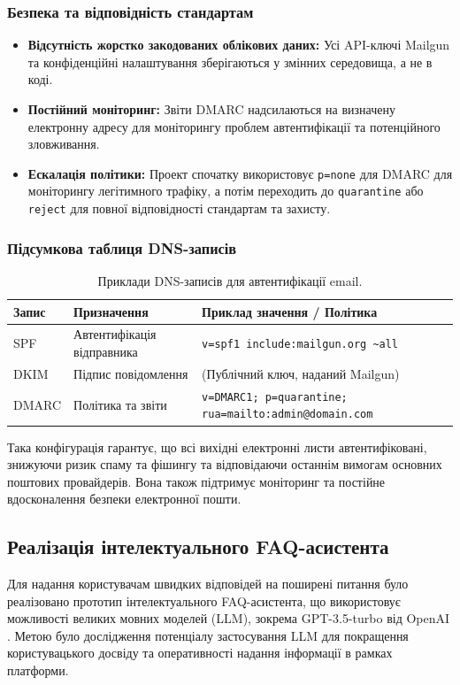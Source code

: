 \subsubsection{Безпека та відповідність стандартам}

\begin{itemize}
    \item \textbf{Відсутність жорстко закодованих облікових даних:} Усі API-ключі Mailgun та конфіденційні налаштування зберігаються у змінних середовища, а не в коді.
    \item \textbf{Постійний моніторинг:} Звіти DMARC надсилаються на визначену електронну адресу для моніторингу проблем автентифікації та потенційного зловживання.
    \item \textbf{Ескалація політики:} Проект спочатку використовує \texttt{p=none} для DMARC для моніторингу легітимного трафіку, а потім переходить до \texttt{quarantine} або \texttt{reject} для повної відповідності стандартам та захисту.
\end{itemize}

\subsubsection{Підсумкова таблиця DNS-записів}

\begin{table}[h!]
\centering
\begin{tabular}{|l|l|l|}
\hline
\textbf{Запис} & \textbf{Призначення} & \textbf{Приклад значення / Політика} \\
\hline
SPF    & Автентифікація відправника & \texttt{v=spf1 include:mailgun.org \~{}all} \\
DKIM   & Підпис повідомлення & (Публічний ключ, наданий Mailgun) \\
DMARC  & Політика та звіти & \texttt{v=DMARC1; p=quarantine; rua=mailto:admin@domain.com} \\
\hline
\end{tabular}
\caption{Приклади DNS-записів для автентифікації email.}
\label{tab:dns_records_email}
\end{table}

Така конфігурація гарантує, що всі вихідні електронні листи автентифіковані, знижуючи ризик спаму та фішингу та відповідаючи останнім вимогам основних поштових провайдерів. Вона також підтримує моніторинг та постійне вдосконалення безпеки електронної пошти.

\subsection{Реалізація інтелектуального FAQ-асистента}
\label{subsec:ai_faq_implementation}
Для надання користувачам швидких відповідей на поширені питання було реалізовано прототип інтелектуального FAQ-асистента, що використовує можливості великих мовних моделей (LLM), зокрема GPT-3.5-turbo від OpenAI \cite{openai_api}. Метою було дослідження потенціалу застосування LLM для покращення користувацького досвіду та оперативності надання інформації в рамках платформи.

